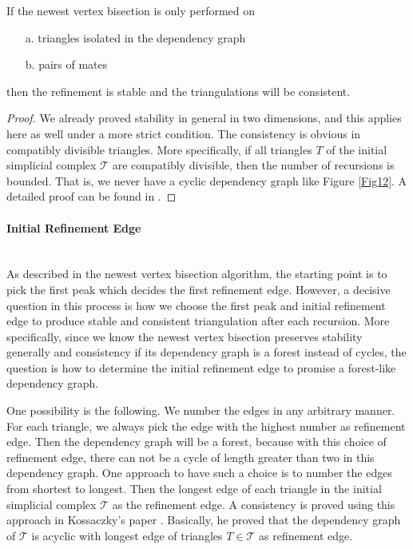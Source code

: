     \begin{lemma}
    If the newest vertex bisection is only performed on 
    \begin{itemize}
        \item[a. ] triangles isolated in the dependency graph
        \item[b. ] pairs of mates
      \end{itemize}
    then the refinement is stable and the triangulations will be consistent.
    \label{lma8}
    \end{lemma}
    \begin{proof}
    We already proved stability in general in two dimensions, and this applies here as well under a more strict condition. The consistency is obvious in compatibly divisible triangles. More specifically, if all triangles $T$ of the initial simplicial complex $\mathcal T$ are compatibly divisible, then the number of recursions is bounded. That is, we never have a cyclic dependency graph like Figure \ref{Fig12}. A detailed proof can be found in \cite{mitchell1988unified, mitchell1991adaptive}.
    \end{proof}

    \paragraph{Initial Refinement Edge}\mbox{}\\
    As described in the newest vertex bisection algorithm, the starting point is to pick the first peak which decides the first refinement edge. However, a decisive question in this process is how we choose the first peak and initial refinement edge to produce stable and consistent triangulation after each recursion. More specifically, since we know the newest vertex bisection preserves stability generally and consistency if its dependency graph is a forest instead of cycles, the question is how to determine the initial refinement edge to promise a forest-like dependency graph. 

    One possibility is the following.
    We number the edges in any arbitrary manner. For each triangle, we always pick the edge with the highest number as refinement edge. Then the dependency graph will be a forest, because with this choice of refinement edge, there can not be a cycle of length greater than two in this dependency graph.
    One approach to have such a choice is to number the edges from shortest to longest.
    Then the longest edge of each triangle in the initial simplicial complex $\mathcal T$ as the refinement edge. A consistency is proved using this approach in Kossaczky's paper \cite{kossaczky1994recursive}. Basically, he proved that the dependency graph of $\mathcal T$ is acyclic with longest edge of triangles $T\in\mathcal T$ as refinement edge.

